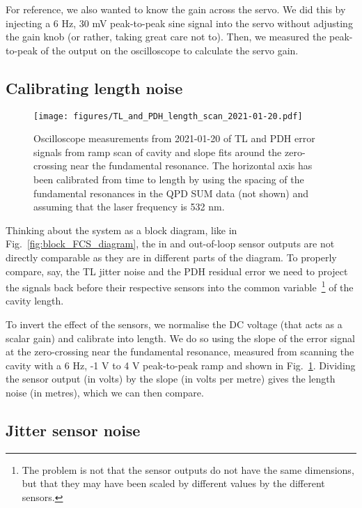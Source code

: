 \documentclass[aps,pra,superscriptaddress,reprint,nofootinbib]{revtex4-1}
\begin{document}
For reference, we also wanted to know the gain across the servo. We did this by injecting a 6 Hz, 30 mV peak-to-peak sine signal into the servo without adjusting the gain knob (or rather, taking great care not to). Then, we measured the peak-to-peak of the output on the oscilloscope to calculate the servo gain.

\subsection{Calibrating length noise}
\label{sec:length_noise}

\begin{figure}
	\texttt{[image: figures/TL\_and\_PDH\_length\_scan\_2021-01-20.pdf]}
	\caption{Oscilloscope measurements from 2021-01-20 of TL and PDH error signals from ramp scan of cavity and slope fits around the zero-crossing near the fundamental resonance. The horizontal axis has been calibrated from time to length by using the spacing of the fundamental resonances in the QPD SUM data (not shown) and assuming that the laser frequency is 532 nm.}
	\label{fig:TL_and_PDH_length_scan_2021-01-20}
\end{figure}

Thinking about the system as a block diagram, like in Fig.~\ref{fig:block_FCS_diagram}, the in and out-of-loop sensor outputs are not directly comparable as they are in different parts of the diagram. To properly compare, say, the TL jitter noise and the PDH residual error we need to project the signals back before their respective sensors into the common variable~\footnote{The problem is not that the sensor outputs do not have the same dimensions, but that they may have been scaled by different values by the different sensors.} of the cavity length.

To invert the effect of the sensors, we normalise the DC voltage (that acts as a scalar gain) and  calibrate into length. We do so using the slope of the error signal at the zero-crossing near the fundamental resonance, measured from scanning the cavity with a 6 Hz, -1 V to 4 V peak-to-peak ramp and shown in Fig.~\ref{fig:TL_and_PDH_length_scan_2021-01-20}. Dividing the sensor output (in volts) by the slope (in volts per metre) gives the length noise (in metres), which we can then compare.


\subsection{Jitter sensor noise}
\label{sec:jitter_sensor_noise}
\end{document}
